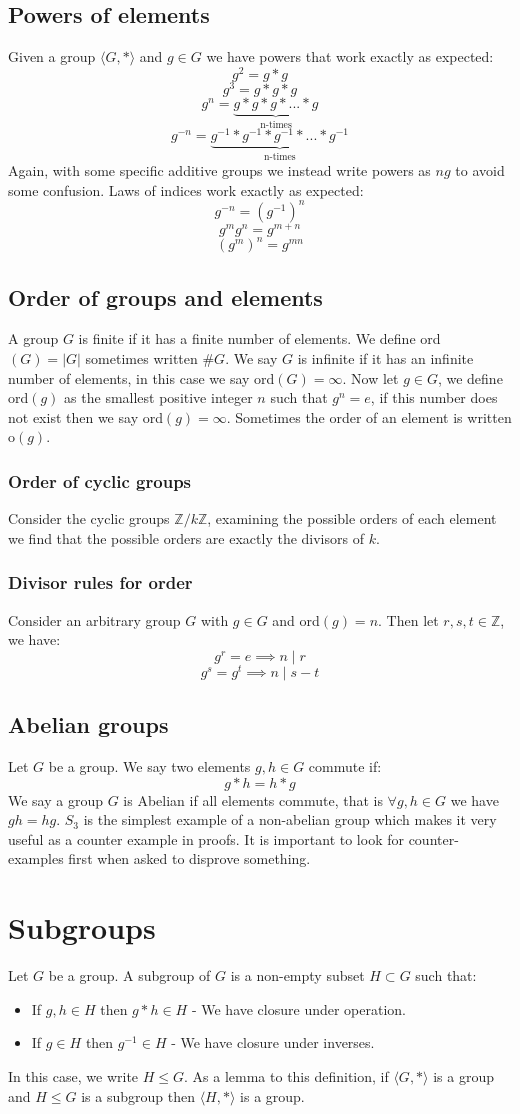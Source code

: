 \documentclass[12pt]{article}
\begin{document}
\subsection*{Powers of elements}
Given a group \(\langle G,*\rangle\) and \(g\in G\) we have powers that work exactly as expected:
\[g^2=g*g\]
\[g^3=g*g*g\]
\[g^n=\underbrace{g*g*g*...*g}_{\text{n-times}}\]
\[g^{-n}=\underbrace{g^{-1}*g^{-1}*g^{-1}*...*g^{-1}}_{\text{n-times}}\]
Again, with some specific additive groups we instead write powers as \(ng\) to avoid some confusion. Laws of indices work exactly as expected:
\[g^{-n}=(g^{-1})^n\]
\[g^mg^n=g^{m+n}\]
\[(g^m)^n=g^{mn}\]
\subsection*{Order of groups and elements}
A group \(G\) is finite if it has a finite number of elements. We define ord\((G)=|G|\) sometimes written \(\#G\). We say \(G\) is infinite if it has an infinite number of elements, in this case we say ord\((G)=\infty\). Now let \(g\in G\), we define ord\((g)\) as the smallest positive integer \(n\) such that \(g^n=e\), if this number does not exist then we say ord\((g)=\infty\). Sometimes the order of an element is written o\((g)\).
\subsubsection*{Order of cyclic groups}
Consider the cyclic groups \(\mathbb{Z}/ k\mathbb{Z}\), examining the possible orders of each element we find that the possible orders are exactly the divisors of \(k\).
\subsubsection*{Divisor rules for order}
Consider an arbitrary group \(G\) with \(g\in G\) and ord\((g)=n\). Then let \(r,s,t\in \mathbb{Z}\), we have:
\[g^r=e\implies n\mid r\]
\[g^s=g^t\implies n\mid s-t\]
\subsection*{Abelian groups}
Let \(G\) be a group. We say two elements \(g,h\in G\) commute if:
\[g*h=h*g\]
We say a group \(G\) is Abelian if all elements commute, that is \(\forall g,h\in G\) we have \(gh=hg\). \(S_3\) is the simplest example of a non-abelian group which makes it very useful as a counter example in proofs. It is important to look for counter-examples first when asked to disprove something.
\section{Subgroups}
Let \(G\) be a group. A subgroup of \(G\) is a non-empty subset \(H\subset G\) such that:
\begin{itemize}
    \item If \(g,h\in H\) then \(g*h\in H\) - We have closure under operation.
    \item If \(g\in H\) then \(g^{-1}\in H\) - We have closure under inverses.
\end{itemize}
In this case, we write \(H\leqslant G\). As a lemma to this definition, if \(\langle G,*\rangle\) is a group and \(H\leqslant G\) is a subgroup then \(\langle H,*\rangle\) is a group.
\end{document}
